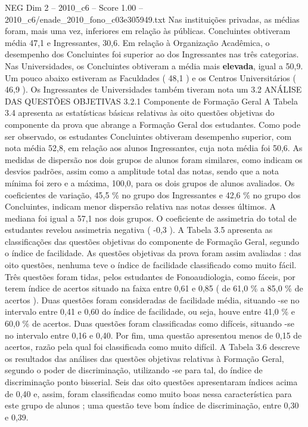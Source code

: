 \begin{textsample}{NEG Dim 2 – 2010\_c6 – Score 1.00 – 2010\_c6/enade\_2010\_fono\_c03e305949.txt}
Nas instituições privadas, as médias foram, mais uma vez, inferiores em relação às públicas.
Concluintes obtiveram média 47,1 e Ingressantes, 30,6.
Em relação à Organização Acadêmica, o desempenho dos Concluintes foi superior ao dos Ingressantes nas três categorias.
Nas Universidades, os Concluintes obtiveram a média mais \textbf{elevada}, igual a 50,9.
Um pouco abaixo estiveram as Faculdades ( 48,1 ) e os Centros Universitários ( 46,9 ).
Os Ingressantes de Universidades também tiveram nota um 3.2 ANÁLISE DAS QUESTÕES OBJETIVAS 3.2.1 Componente de Formação Geral A Tabela 3.4 apresenta as estatísticas básicas relativas às oito questões objetivas do componente da prova que abrange a Formação Geral dos estudantes.
Como pode ser observado, os estudantes Concluintes obtiveram desempenho superior, com nota média 52,8, em relação aos alunos Ingressantes, cuja nota média foi 50,6.
As medidas de dispersão nos dois grupos de alunos foram similares, como indicam os desvios padrões, assim como a amplitude total das notas, sendo que a nota mínima foi zero e a máxima, 100,0, para os dois grupos de alunos avaliados.
Os coeficientes de variação, 45,5 \% no grupo dos Ingressantes e 42,6 \% no grupo dos Concluintes, indicam menor dispersão relativa nas notas desses últimos.
A mediana foi igual a 57,1 nos dois grupos.
O coeficiente de assimetria do total de estudantes revelou assimetria negativa ( -0,3 ).
A Tabela 3.5 apresenta as classificações das questões objetivas do componente de Formação Geral, segundo o índice de facilidade.
As questões objetivas da prova foram assim avaliadas : das oito questões, nenhuma teve o índice de facilidade classificado como muito fácil.
Três questões foram tidas, pelos estudantes de Fonoaudiologia, como fáceis, por terem índice de acertos situado na faixa entre 0,61 e 0,85 ( de 61,0 \% a 85,0 \% de acertos ).
Duas questões foram consideradas de facilidade média, situando -se no intervalo entre 0,41 e 0,60 do índice de facilidade, ou seja, houve entre 41,0 \% e 60,0 \% de acertos.
Duas questões foram classificadas como difíceis, situando -se no intervalo entre 0,16 e 0,40.
Por fim, uma questão apresentou menos de 0,15 de acertos, razão pela qual foi classificada como muito difícil.
A Tabela 3.6 descreve os resultados das análises das questões objetivas relativas à Formação Geral, segundo o poder de discriminação, utilizando -se para tal, do índice de discriminação ponto bisserial.
Seis das oito questões apresentaram índices acima de 0,40 e, assim, foram classificadas como muito boas nessa característica para este grupo de alunos ; uma questão teve bom índice de discriminação, entre 0,30 e 0,39.

\end{textsample}
